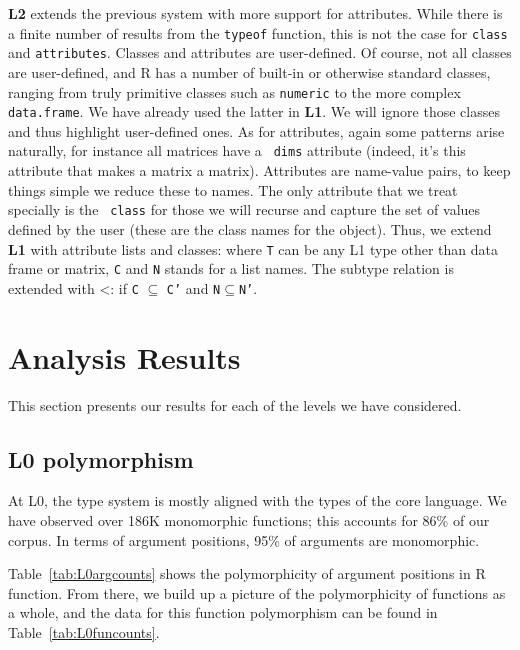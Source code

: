 \documentclass[acmsmall,10pt,review,anonymous]{acmart}\settopmatter{printfolios=true,printccs=false,printacmref=false}
\newcommand{\code}[1]{\lstinline|#1|\xspace}
\begin{document}
{\bf L2} extends the previous system with more support for attributes.
While there is a finite number of results from the {\tt typeof} function,
this is not the case for \code{class} and \code{attributes}.  Classes and
attributes are user-defined.  Of course, not all classes are user-defined,
and R has a number of built-in or otherwise standard classes, ranging from
truly primitive classes such as {\tt numeric} to the more complex {\tt
  data.frame}.  We have already used the latter in {\bf L1}. We will ignore
those classes and thus highlight user-defined ones.  As for attributes,
again some patterns arise naturally, for instance all matrices have a {\tt
  dims} attribute (indeed, it's this attribute that makes a matrix a
matrix).  Attributes are name-value pairs, to keep things simple we reduce
these to names. The only attribute that we treat specially is the {\tt
  class} for those we will recurse and capture the set of values defined by
the user (these are the class names for the object).  Thus, we extend {\bf
  L1} with attribute lists and classes:  where {\tt T}
can be any L1 type other than data frame or matrix, {\tt C} and {\tt N}
stands for a list names.  The subtype relation is extended with
<: if {\tt C} $\subseteq$ {\tt C'}
and {\tt N}$\subseteq${\tt N'}.



\section{Analysis Results}\label{sec:results}

This section presents our results for each of the levels we have considered.

\subsection{L0 polymorphism}

At L0, the type system is mostly aligned with the types of the core language.  We
have observed over 186K monomorphic functions; this accounts for 86\% of our
corpus.  In terms of argument positions, 95\% of arguments are monomorphic.

Table~\ref{tab:L0argcounts} shows the polymorphicity of argument positions
 in R function.  From there, we build up a picture of the polymorphicity of
 functions as a whole, and the data for this function polymorphism can be
 found in Table~\ref{tab:L0funcounts}.
\end{document}
